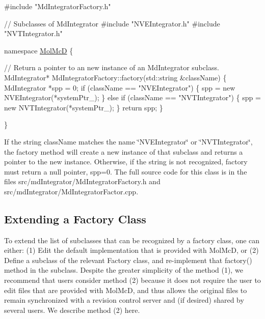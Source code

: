 \begin{DoxyCode}
\textcolor{preprocessor}{#include "MdIntegratorFactory.h"}

\textcolor{comment}{// Subclasses of MdIntegrator }
\textcolor{preprocessor}{#include "NVEIntegrator.h"}
\textcolor{preprocessor}{#include "NVTIntegrator.h"}

\textcolor{keyword}{namespace }\hyperlink{namespaceMolMcD}{MolMcD} 
\{

   \textcolor{comment}{// Return a pointer to an new instance of an MdIntegrator subclass.}
   MdIntegrator* MdIntegratorFactory::factory(std::string &className)
   \{
      MdIntegrator *spp = 0;
      \textcolor{keywordflow}{if} (className == \textcolor{stringliteral}{"NVEIntegrator"}) \{
         spp = \textcolor{keyword}{new} NVEIntegrator(*systemPtr\_);
      \} \textcolor{keywordflow}{else}
      \textcolor{keywordflow}{if} (className == \textcolor{stringliteral}{"NVTIntegrator"}) \{
         spp = \textcolor{keyword}{new} NVTIntegrator(*systemPtr\_);
      \}
      \textcolor{keywordflow}{return} spp;
   \}

\}
\end{DoxyCode}
 If the string class\+Name matches the name \char`\"{}\+N\+V\+E\+Integrator\char`\"{} or \char`\"{}\+N\+V\+T\+Integrator\char`\"{}, the factory method will create a new instance of that subclass and returns a pointer to the new instance. Otherwise, if the string is not recognized, factory must return a null pointer, spp=0. The full source code for this class is in the files src/md\+Integrator/\+Md\+Integrator\+Factory.\+h and src/md\+Integrator/\+Md\+Integrator\+Factor.\+cpp.\hypertarget{extension_page_custom_factory_extend_sec}{}\subsection{Extending a Factory Class}\label{extension_page_custom_factory_extend_sec}
To extend the list of subclasses that can be recognized by a factory class, one can either\+: (1) Edit the default implementation that is provided with Mol\+McD, or (2) Define a subclass of the relevant Factory class, and re-\/implement that factory() method in the subclass. Despite the greater simplicity of the method (1), we recommend that users consider method (2) because it does not require the user to edit files that are provided with Mol\+McD, and thus allows the original files to remain synchronized with a revision control server and (if desired) shared by several users. We describe method (2) here.

